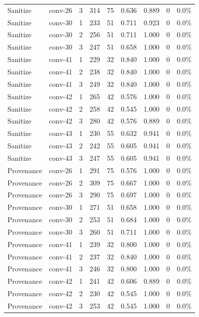 {\begin{longtable}{@{}l l r r r r r r r@{}}
Sanitize & conv-26 & 3 & 314 & 75 & 0.636 & 0.889 & 0 & 0.0\% \\
Sanitize & conv-30 & 1 & 233 & 51 & 0.711 & 0.923 & 0 & 0.0\% \\
Sanitize & conv-30 & 2 & 256 & 51 & 0.711 & 1.000 & 0 & 0.0\% \\
Sanitize & conv-30 & 3 & 247 & 51 & 0.658 & 1.000 & 0 & 0.0\% \\
Sanitize & conv-41 & 1 & 229 & 32 & 0.840 & 1.000 & 0 & 0.0\% \\
Sanitize & conv-41 & 2 & 238 & 32 & 0.840 & 1.000 & 0 & 0.0\% \\
Sanitize & conv-41 & 3 & 249 & 32 & 0.840 & 1.000 & 0 & 0.0\% \\
Sanitize & conv-42 & 1 & 265 & 42 & 0.576 & 1.000 & 0 & 0.0\% \\
Sanitize & conv-42 & 2 & 258 & 42 & 0.545 & 1.000 & 0 & 0.0\% \\
Sanitize & conv-42 & 3 & 280 & 42 & 0.576 & 0.889 & 0 & 0.0\% \\
Sanitize & conv-43 & 1 & 230 & 55 & 0.632 & 0.941 & 0 & 0.0\% \\
Sanitize & conv-43 & 2 & 242 & 55 & 0.605 & 0.941 & 0 & 0.0\% \\
Sanitize & conv-43 & 3 & 247 & 55 & 0.605 & 0.941 & 0 & 0.0\% \\
\midrule
Provenance & conv-26 & 1 & 291 & 75 & 0.576 & 1.000 & 0 & 0.0\% \\
Provenance & conv-26 & 2 & 309 & 75 & 0.667 & 1.000 & 0 & 0.0\% \\
Provenance & conv-26 & 3 & 290 & 75 & 0.697 & 1.000 & 0 & 0.0\% \\
Provenance & conv-30 & 1 & 271 & 51 & 0.658 & 1.000 & 0 & 0.0\% \\
Provenance & conv-30 & 2 & 253 & 51 & 0.684 & 1.000 & 0 & 0.0\% \\
Provenance & conv-30 & 3 & 260 & 51 & 0.711 & 1.000 & 0 & 0.0\% \\
Provenance & conv-41 & 1 & 239 & 32 & 0.800 & 1.000 & 0 & 0.0\% \\
Provenance & conv-41 & 2 & 237 & 32 & 0.840 & 1.000 & 0 & 0.0\% \\
Provenance & conv-41 & 3 & 246 & 32 & 0.800 & 1.000 & 0 & 0.0\% \\
Provenance & conv-42 & 1 & 241 & 42 & 0.606 & 0.889 & 0 & 0.0\% \\
Provenance & conv-42 & 2 & 230 & 42 & 0.545 & 1.000 & 0 & 0.0\% \\
Provenance & conv-42 & 3 & 253 & 42 & 0.545 & 1.000 & 0 & 0.0\% \\

\end{longtable}}
